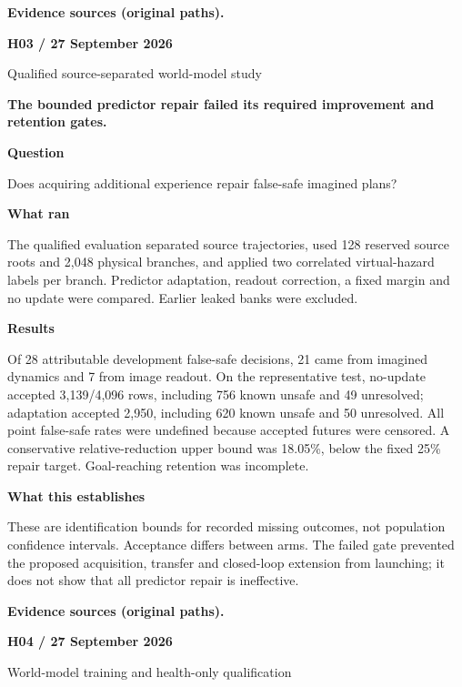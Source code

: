 \documentclass[11pt,a4paper]{article}
\newcommand{\block}[2]{\par\textbf{\color{ink}#1}\par\nopagebreak #2\par}
\newcommand{\finding}[1]{\begin{tcolorbox}[colback=pale,colframe=pale,boxrule=0pt,arc=1mm,left=10pt,right=10pt,top=10pt,bottom=10pt]\color{ink}\large\bfseries #1\end{tcolorbox}}
\begin{document}
\vfill{\footnotesize\color{muted}\textbf{Evidence sources (original paths).}\par
\raggedright {}}
\clearpage
{}\label{exp:H03}
{\color{accent}\small\bfseries H03 / 27 September 2026}\par
{}\par
{\color{muted}\small Qualified source-separated world-model study}\par\vspace{2mm}
\finding{The bounded predictor repair failed its required improvement and retention gates.}
\block{Question}{Does acquiring additional experience repair false-safe imagined plans?}
\block{What ran}{The qualified evaluation separated source trajectories, used 128 reserved source roots and 2,048 physical branches, and applied two correlated virtual-hazard labels per branch. Predictor adaptation, readout correction, a fixed margin and no update were compared. Earlier leaked banks were excluded.}
\block{Results}{Of 28 attributable development false-safe decisions, 21 came from imagined dynamics and 7 from image readout. On the representative test, no-update accepted 3,139/4,096 rows, including 756 known unsafe and 49 unresolved; adaptation accepted 2,950, including 620 known unsafe and 50 unresolved. All point false-safe rates were undefined because accepted futures were censored. A conservative relative-reduction upper bound was 18.05\%, below the fixed 25\% repair target. Goal-reaching retention was incomplete.}
\block{What this establishes}{These are identification bounds for recorded missing outcomes, not population confidence intervals. Acceptance differs between arms. The failed gate prevented the proposed acquisition, transfer and closed-loop extension from launching; it does not show that all predictor repair is ineffective.}
\vfill{\footnotesize\color{muted}\textbf{Evidence sources (original paths).}\par
\raggedright {}}
\clearpage
{}\label{exp:H04}
{\color{accent}\small\bfseries H04 / 27 September 2026}\par
{}\par
{\color{muted}\small World-model training and health-only qualification}\par\vspace{2mm}
\end{document}
